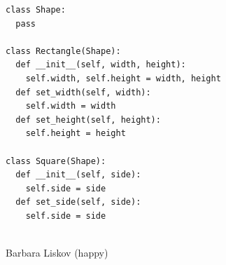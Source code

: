 \documentclass[calcdimensions,landscape,letterpaper]{powersem}
\newcommand{\thecurrentheading}{}
\newcommand{\heading}[1]{\renewcommand{\thecurrentheading}{#1}}
\begin{document}
\begin{slide}
  \heading{Liskov-Substitution - After}
  \begin{center}
    \begin{minipage}[b]{.6\textwidth}
      \begin{verbatim}
class Shape:
  pass

class Rectangle(Shape):
  def __init__(self, width, height):
    self.width, self.height = width, height
  def set_width(self, width):
    self.width = width
  def set_height(self, height):
    self.height = height

class Square(Shape):
  def __init__(self, side):
    self.side = side
  def set_side(self, side):
    self.side = side
      \end{verbatim}
    \end{minipage}
    \begin{minipage}[b]{.35\textwidth}
      \begin{center}
        \\
        Barbara Liskov (happy)
      \end{center}
    \end{minipage}
  \end{center}
\end{slide}
\end{document}
